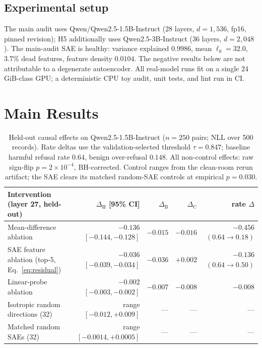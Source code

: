 \documentclass[11pt]{article}
\newcommand{\dH}{\ensuremath{\Delta_{\mathrm{H}}}}
\newcommand{\dB}{\ensuremath{\Delta_{\mathrm{B}}}}
\newcommand{\dC}{\ensuremath{\Delta_{\mathrm{C}}}}
\begin{document}
\subsection{Experimental setup}
\label{sec:models}

The main audit uses Qwen/Qwen2.5-1.5B-Instruct \citep{qwen2024qwen25}
(28 layers, $d=1{,}536$, fp16, pinned revision); H5 additionally uses
Qwen2.5-3B-Instruct (36 layers, $d=2{,}048$).  The main-audit SAE is healthy:
variance explained $0.9986$, mean $\ell_0=32.0$, $3.7\%$ dead features,
feature density $0.0104$.  The negative results below are not attributable to
a degenerate autoencoder.  All real-model runs fit on a single 24\,GiB-class
GPU; a deterministic CPU toy audit, unit tests, and lint run in CI.

\section{Main Results}
\label{sec:results}

\begin{table}[t]
\centering
\small
\begin{tabular}{@{}lrrrr@{}}
\toprule
Intervention (layer 27, held-out) & \dH{} [95\% CI] & \dB{} & \dC{} & rate $\Delta$ \\
\midrule
Mean-difference ablation & $\mathbf{-0.136}$ $[-0.144,-0.128]$ & $-0.015$ & $-0.016$ & $\mathbf{-0.456}$ $(0.64\!\to\!0.18)$ \\
SAE feature ablation (top-5, Eq.~\ref{eq:residual}) & $-0.036$ $[-0.039,-0.034]$ & $-0.036$ & $+0.002$ & $-0.136$ $(0.64\!\to\!0.50)$ \\
Linear-probe ablation & $-0.002$ $[-0.003,-0.002]$ & $-0.007$ & $-0.008$ & $-0.008$ \\
\addlinespace
Isotropic random directions (32) & range $[-0.012,+0.009]$ & --- & --- & --- \\
Matched random SAEs (32) & range $[-0.0014,+0.0005]$ & --- & --- & --- \\
\bottomrule
\end{tabular}
\caption{Held-out causal effects on Qwen2.5-1.5B-Instruct ($n=250$ pairs; NLL
over 500 records).  Rate deltas use the validation-selected threshold
$\tau=0.847$; baseline harmful refusal rate $0.64$, benign over-refusal
$0.148$.  All non-control effects: raw sign-flip $p=2\times10^{-4}$, BH-corrected.
Control ranges from the clean-room rerun artifact; the SAE clears its matched
random-SAE controls at empirical $p=0.030$.}
\label{tab:main}
\end{table}
\end{document}

